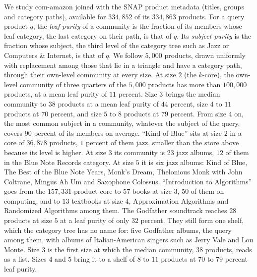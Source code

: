We study \textsf{com-amazon} joined with the SNAP product metadata (titles, groups and category paths), available for $334{,}852$ of its $334{,}863$ products.
%
For a query product $q$, the \textit{leaf purity} of a community is the fraction of its members whose leaf category, the last category on their path, is that of $q$.
%
Its \textit{subject purity} is the fraction whose subject, the third level of the category tree such as Jazz or Computers \& Internet, is that of $q$.
%
We follow $5{,}000$ products, drawn uniformly with replacement among those that lie in a triangle and have a category path, through their own-level community at every size.
%
At size $2$ (the $k$-core), the own-level community of three quarters of the $5{,}000$ products has more than $100{,}000$ products, at a mean leaf purity of $11$ percent.
%
Size $3$ brings the median community to $38$ products at a mean leaf purity of $44$ percent, size $4$ to $11$ products at $70$ percent, and size $5$ to $8$ products at $79$ percent.
%
From size $4$ on, the most common subject in a community, whatever the subject of the query, covers $90$ percent of its members on average.
%
``Kind of Blue'' sits at size $2$ in a core of $36{,}878$ products, $1$ percent of them jazz, smaller than the store above because its level is higher.
%
At size $3$ its community is $23$ jazz albums, $12$ of them in the Blue Note Records category.
%
At size $5$ it is six jazz albums: Kind of Blue, The Best of the Blue Note Years, Monk's Dream, Thelonious Monk with John Coltrane, Mingus Ah Um and Saxophone Colossus.
%
``Introduction to Algorithms'' goes from the $157{,}331$-product core to $57$ books at size $3$, $50$ of them on computing, and to $13$ textbooks at size $4$, Approximation Algorithms and Randomized Algorithms among them.
%
The Godfather soundtrack reaches $28$ products at size $5$ at a leaf purity of only $32$ percent.
%
They still form one shelf, which the category tree has no name for: five Godfather albums, the query among them, with albums of Italian-American singers such as Jerry Vale and Lou Monte.
%
Size $3$ is the first size at which the median community, $38$ products, reads as a list.
%
Sizes $4$ and $5$ bring it to a shelf of $8$ to $11$ products at $70$ to $79$ percent leaf purity.

